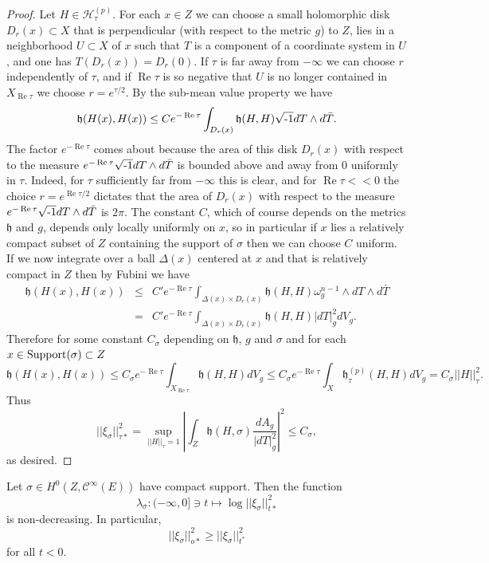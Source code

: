 \documentclass[12pt,hidelinks]{amsart}
\newcommand{\sC}{{\mathscr C}}
\newcommand{\sH}{{\mathscr H}}
\newcommand{\fh}{{\mathfrak h}}
\renewcommand{\Re}{\operatorname{Re}}
\newcommand{\re}{\Re}
\newcommand{\ii}{\sqrt{\text{\rm -}1}}
\begin{document}
\begin{proof}
Let $H \in \sH ^{(p)}_{\tau}$.  For each $x \in Z$ we can choose a small holomorphic disk $D_r(x) \subset X$ that is perpendicular (with respect to the metric $g$) to $Z$, lies in a neighborhood $U \subset X$ of $x$ such that $T$ is a component of a coordinate system in $U$, and one has $T (D_r(x)) = D_r(0)$.  If $\tau$ is far away from $-\infty$ we can choose $r$ independently of $\tau$, and if $\re \tau$ is so negative that $U$ is no longer contained in $X_{\re \tau}$ we choose $r = e^{\tau/2}$.  By the sub-mean value property we have 
\[
\fh (H(x), H(x)) \le C e^{- \re \tau}\int _{D_r(x)} \fh (H,H) \ii dT \wedge d\bar T.
\]
The factor $e^{-\re \tau}$ comes about because the area of this disk $D_r(x)$ with respect to the measure $e^{-\re \tau}\ii dT \wedge d\bar T$ is bounded above and away from $0$ uniformly in $\tau$.  Indeed, for $\tau$ sufficiently far from $-\infty$ this is clear, and for $\re \tau << 0$ the choice $r = e^{\re \tau/2}$ dictates that the area of $D_r(x)$ with respect to the measure $e^{-\re \tau} \ii dT \wedge d\bar T$ is $2\pi$.  The constant $C$, which of course depends on the metrics $\fh$ and $g$, depends only locally uniformly on $x$, so in particular if $x$ lies a relatively compact subset of $Z$ containing the support of $\sigma$ then we can choose $C$ uniform.  If we now integrate over a ball $\Delta(x)$ centered at $x$ and that is relatively compact in $Z$ then by Fubini we have 
\begin{eqnarray*}
\fh (H(x), H(x)) &\le& C'e^{-\re \tau} \int _{\Delta (x) \times D_r(x)} \fh (H,H) \omega_g ^{n-1} \wedge dT \wedge d\bar T \\
&=&  C' e^{-\re \tau} \int _{\Delta(x) \times D_r(x)} \fh (H,H) |dT|^2_gdV_g.
\end{eqnarray*}
Therefore for some constant $C_{\sigma}$ depending on $\fh$, $g$ and $\sigma$ and for each $x \in {\rm Support}({\sigma})\subset Z$ 
\[
\fh (H(x), H(x))  \le C_{\sigma} e^{- \Re \tau} \int _{X_{\Re \tau}} \fh (H,H)dV_g \le C_{\sigma} e^{- \Re \tau} \int _{X} \fh ^{(p)} _{\tau}(H,H)dV_g =  C_{\sigma} ||H||^2_{\tau}.
\]
Thus 
\[
||\xi_{\sigma}||^2_{\tau *} = \sup _{||H||_{\tau} = 1} \left | \int _Z \fh (H , {\sigma})  \frac{dA_g}{|dT|^2_{g}}\right |^2 \le C_{\sigma},
\]
as desired.
\end{proof}

\begin{lem}\label{convex-inc}
Let $\sigma \in H^0(Z, \sC^{\infty}(E))$ have compact support.  Then the function 
\[
\lambda_{\sigma}  : (-\infty, 0] \ni t \mapsto \log ||\xi _{\sigma}||^2_{t*}
\]
is non-decreasing.  In particular, 
\[
||\xi_{\sigma}||^2_{o*} \ge  ||\xi_{\sigma}||^2_{t^*}
\]
for all $t < 0$.
\end{lem}
\end{document}
